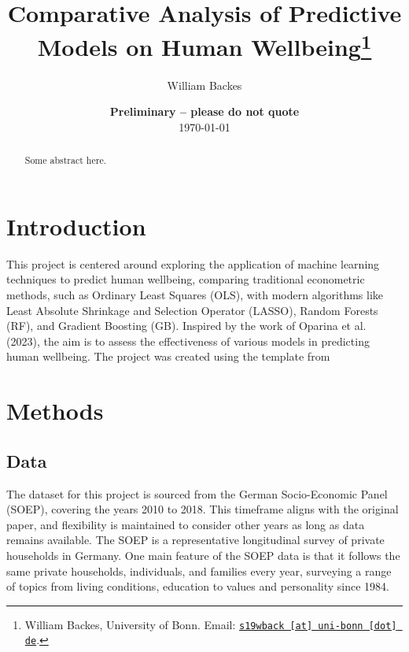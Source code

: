 \documentclass[11pt, a4paper, leqno]{article}
\begin{document}
\title{Comparative Analysis of Predictive Models on Human Wellbeing\thanks{William Backes, University of Bonn. Email: \href{mailto:s19wback@uni-bonn.de}{\nolinkurl{s19wback [at] uni-bonn [dot] de}}.}}

\author{William Backes}

\date{
    {\bf Preliminary -- please do not quote}
    \\[1ex]
    \today
}

\maketitle


\begin{abstract}
    Some abstract here.
\end{abstract}

\clearpage


\section{Introduction} %
\label{sec:introduction}

This project is centered around exploring the application of machine learning techniques
to predict human wellbeing, comparing traditional econometric methods, such as Ordinary
Least Squares (OLS), with modern algorithms like Least Absolute Shrinkage and Selection
Operator (LASSO), Random Forests (RF), and Gradient Boosting (GB). Inspired by the work
of Oparina et al. (2023), the aim is to assess the effectiveness of various models in
predicting human wellbeing. The project was created using the template from \citet{GaudeckerEconProjectTemplates}

\section{Methods} %
\label{sec:methods}

\subsection{Data}
The dataset for this project is sourced from the German Socio-Economic Panel (SOEP),
covering the years 2010 to 2018. This timeframe aligns with the original paper, and
flexibility is maintained to consider other years as long as data remains available.
The SOEP is a representative longitudinal survey of private households in Germany. One main feature of the SOEP data is that it follows the same private households, individuals, and families every year, surveying a range of topics from living conditions, education to values and personality since 1984.
\end{document}
